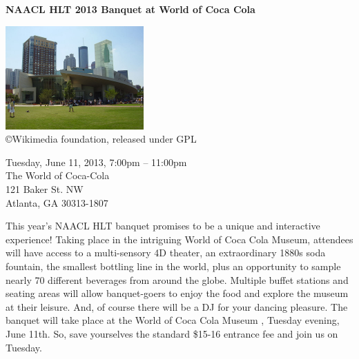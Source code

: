 \begin{center}

\begin{Large}
{\bfseries\Large NAACL HLT 2013 Banquet at World of Coca Cola}\vspace{1em}\par
\end{Large}

\includegraphics[height=150px]{content/day3/cocacola.jpg} \\

{\tiny \copyright Wikimedia foundation, released under GPL}

Tuesday, June 11, 2013, 7:00pm -- 11:00pm \vspace{1em}\\
The World of Coca-Cola\\
121 Baker St. NW\\
Atlanta, GA 30313-1807\\
\end{center}

\noindent
This year's NAACL HLT banquet promises to be a unique and interactive experience! Taking place in the
intriguing World of Coca Cola Museum, attendees will have access to a multi-sensory 4D theater, an
extraordinary 1880s soda fountain, the smallest bottling line in the world, plus an opportunity to
sample nearly 70 different beverages from around the globe. Multiple buffet stations and seating
areas will allow banquet-goers to enjoy the food and explore the museum at their leisure. And, of
course there will be a DJ for your dancing pleasure. The banquet will take place at the World of
Coca Cola Museum , Tuesday evening, June 11th. So, save yourselves the standard \$15-16 entrance fee
and join us on Tuesday.


\newpage
